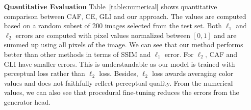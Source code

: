 \noindent\textbf{Quantitative Evaluation} Table~\ref{table:numerical} shows quantitative comparison between CAF, CE, GLI and our approach. The values are computed based on a random subset of 200 images selected from the test set. Both $\ell_1$ and $\ell_2$ errors are computed with pixel values normalized between $[0,1]$ and are summed up using all pixels of the image. We can see that our method performs better than other methods in terms of SSIM and $\ell_1$ error. For $\ell_2$, CAF and GLI have smaller errors. This is understandable as our model is trained with perceptual loss rather than $\ell_2$ loss. Besides, $\ell_2$ loss awards averaging color values and does not faithfully reflect perceptual quality. From the numerical values, we can also see that procedural fine-tuning reduces the errors from the generator head. 

\begin{table}[h!]
\begin{center}
  \end{center}
  \caption{Numerical comparison between CAF, CE and GLI, our generator head results and our final results. Up/down are results of center/random region completion. Note that for SSIM, larger values mean greater similarity in terms of content structure and indicate better performance.}
  \vspace{-20pt}
  \label{table:numerical}
\end{table}

